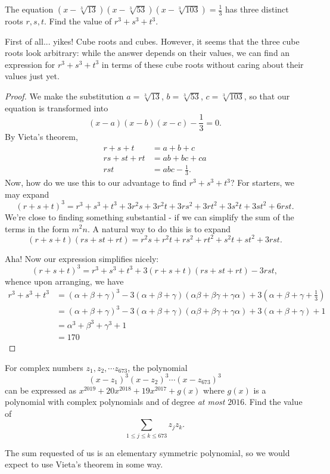 \documentclass[../jarvis.tex]{subfiles}
\begin{document}
\begin{example}
    The equation $(x-\sqrt[3]{13})(x-\sqrt[3]{53})(x-\sqrt[3]{103})=\frac{1}{3}$ has three distinct roots $r,s,t$. Find the value of $r^3+s^3+t^3$.
\end{example}

First of all... yikes! Cube roots and cubes. However, it seems that the three cube roots look arbitrary: while the answer depends on their values, we can find an expression for $r^3+s^3+t^3$ in terms of these cube roots without caring about their values just yet. 
\begin{proof}
    We make the substitution $a=\sqrt[3]{13}$, $b=\sqrt[3]{53}$, $c=\sqrt[3]{103}$, so that our equation is transformed into $$(x-a)(x-b)(x-c)-\frac{1}{3}=0.$$ By Vieta's theorem, 
\begin{align*}
    r+s+t&=a+b+c \\
    rs+st+rt&=ab+bc+ca \\
    rst&=abc-\frac{1}{3}.
\end{align*}
Now, how do we use this to our advantage to find $r^3+s^3+t^3$? For starters, we may expand
$$(r+s+t)^3=r^3+s^3+t^3+3r^2s+3r^2t+3rs^2+3rt^2+3s^2t+3st^2+6rst.$$
We're close to finding something substantial - if we can simplify the sum of the terms in the form $m^2n$. A natural way to do this is to expand
$$(r+s+t)(rs+st+rt)=r^2s+r^2t+rs^2+rt^2+s^2t+st^2+3rst.$$

Aha! Now our expression simplifies nicely:
$$(r+s+t)^3=r^3+s^3+t^3+3(r+s+t)(rs+st+rt)-3rst,$$
whence upon arranging, we have
\begin{align*}
    r^3+s^3+t^3
    &=(\alpha+\beta+\gamma)^3-3(\alpha+\beta+\gamma)(\alpha\beta+\beta\gamma+\gamma\alpha)+3(\alpha+\beta+\gamma+\frac{1}{3})\\
    &=(\alpha+\beta+\gamma)^3-3(\alpha+\beta+\gamma)(\alpha\beta+\beta\gamma+\gamma\alpha)+3(\alpha+\beta+\gamma)+1 \\
    &=\alpha^3+\beta^3+\gamma^3+1 \\
    &=\boxed{170}
\end{align*}
\end{proof}

\begin{example}[2019 AIME I P10]
For complex numbers $z_1, z_2,\cdots z_{673}$, the polynomial
$$(x-z_1)^3(x-z_2)^3\cdots(x-z_673)^3$$
can be expressed as $x^{2019}+20x^{2018}+19x^{2017}+g(x)$ where $g(x)$ is a polynomial with complex polynomials and of degree \textit{at most} $2016$. Find the value of 
$$\sum_{1\leq j\leq k\leq 673}z_jz_k.$$
\end{example}
The sum requested of us is an elementary symmetric polynomial, so we would expect to use Vieta's theorem in some way.
\end{document}
